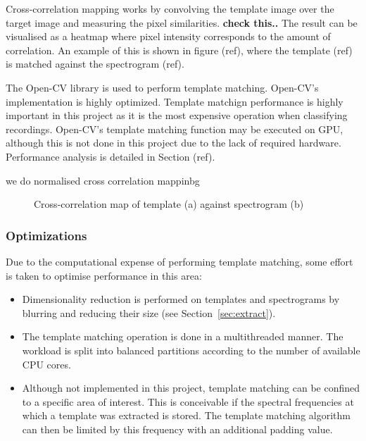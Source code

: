 Cross-correlation mapping works by convolving the template image
over the target image and measuring the pixel similarities.
\textbf{check this..}
The result can be visualised as a heatmap where pixel intensity corresponds to
the amount of correlation.
An example of this is shown in figure (ref), where the template (ref) is matched
against the spectrogram (ref).

The Open-CV library is used to perform template matching.
Open-CV's implementation is highly optimized.
Template matchign performance is highly important in this project as it is the
most expensive operation when classifying recordings.
Open-CV's template matching function may be executed on GPU, although this is
not done in this project due to the lack of required hardware.
Performance analysis is detailed in Section (ref).


we do normalised cross correlation mappinbg

\begin{figure}[t!]
  \centering
  \begin{subfigure}[t]{0.5\textwidth}
    \centering
    \caption{}
  \end{subfigure}
  \begin{subfigure}[t]{0.5\textwidth}
    \centering
    \caption{}
  \end{subfigure}
  \caption{Cross-correlation map of template (a) against spectrogram (b)}
\end{figure}

\subsubsection{Optimizations}
Due to the computational expense of performing template matching, some effort is
taken to optimise performance in this area:

\begin{itemize}
  \item Dimensionality reduction is performed on templates and spectrograms by
blurring and reducing their size (see Section~\ref{sec:extract}).

  \item The template matching operation is done in a multithreaded manner.
The workload is split into balanced partitions according to the number of
available CPU cores.

  \item Although not implemented in this project, template matching can be
confined to a specific area of interest.
This is conceivable if the spectral frequencies at which a template was extracted
is stored.
The template matching algorithm can then be limited by this frequency with an
additional padding value.
\end{itemize}

